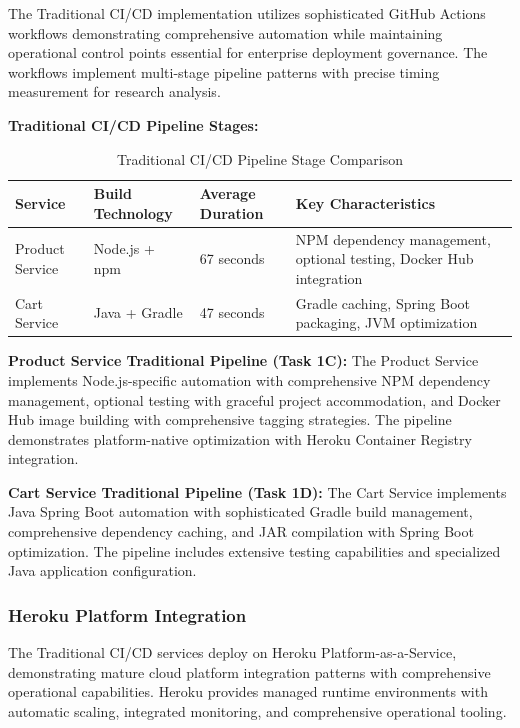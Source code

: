 The Traditional CI/CD implementation utilizes sophisticated GitHub Actions workflows demonstrating comprehensive automation while maintaining operational control points essential for enterprise deployment governance. The workflows implement multi-stage pipeline patterns with precise timing measurement for research analysis.

\textbf{Traditional CI/CD Pipeline Stages:}

\begin{table}[H]
\centering
\caption{Traditional CI/CD Pipeline Stage Comparison}
\label{tab:traditional-pipeline-stages}
\begin{tabular}{|p{3cm}|p{3cm}|p{3cm}|p{5cm}|}
\hline
\textbf{Service} & \textbf{Build Technology} & \textbf{Average Duration} & \textbf{Key Characteristics} \\
\hline
Product Service & Node.js + npm & 67 seconds & NPM dependency management, optional testing, Docker Hub integration \\
\hline
Cart Service & Java + Gradle & 47 seconds & Gradle caching, Spring Boot packaging, JVM optimization \\
\hline
\end{tabular}
\end{table}

\textbf{Product Service Traditional Pipeline (Task 1C):}
The Product Service implements Node.js-specific automation with comprehensive NPM dependency management, optional testing with graceful project accommodation, and Docker Hub image building with comprehensive tagging strategies. The pipeline demonstrates platform-native optimization with Heroku Container Registry integration.

\textbf{Cart Service Traditional Pipeline (Task 1D):}
The Cart Service implements Java Spring Boot automation with sophisticated Gradle build management, comprehensive dependency caching, and JAR compilation with Spring Boot optimization. The pipeline includes extensive testing capabilities and specialized Java application configuration.

\subsubsection{Heroku Platform Integration}

The Traditional CI/CD services deploy on Heroku Platform-as-a-Service, demonstrating mature cloud platform integration patterns with comprehensive operational capabilities. Heroku provides managed runtime environments with automatic scaling, integrated monitoring, and comprehensive operational tooling.

